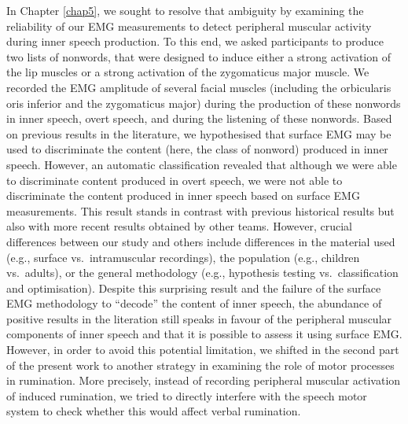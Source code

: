 \documentclass[a4paper,12pt,twoside,openright,oldfontcommands]{memoir}
\begin{document}
In Chapter \ref{chap5}, we sought to resolve that ambiguity by examining the reliability of our EMG measurements to detect peripheral muscular activity during inner speech production. To this end, we asked participants to produce two lists of nonwords, that were designed to induce either a strong activation of the lip muscles or a strong activation of the zygomaticus major muscle. We recorded the EMG amplitude of several facial muscles (including the orbicularis oris inferior and the zygomaticus major) during the production of these nonwords in inner speech, overt speech, and during the listening of these nonwords. Based on previous results in the literature, we hypothesised that surface EMG may be used to discriminate the content (here, the class of nonword) produced in inner speech. However, an automatic classification revealed that although we were able to discriminate content produced in overt speech, we were not able to discriminate the content produced in inner speech based on surface EMG measurements. This result stands in contrast with previous historical results but also with more recent results obtained by other teams. However, crucial differences between our study and others include differences in the material used (e.g., surface vs.~intramuscular recordings), the population (e.g., children vs.~adults), or the general methodology (e.g., hypothesis testing vs.~classification and optimisation). Despite this surprising result and the failure of the surface EMG methodology to \enquote{decode} the content of inner speech, the abundance of positive results in the literation still speaks in favour of the peripheral muscular components of inner speech and that it is possible to assess it using surface EMG. However, in order to avoid this potential limitation, we shifted in the second part of the present work to another strategy in examining the role of motor processes in rumination. More precisely, instead of recording peripheral muscular activation of induced rumination, we tried to directly interfere with the speech motor system to check whether this would affect verbal rumination.
\end{document}
